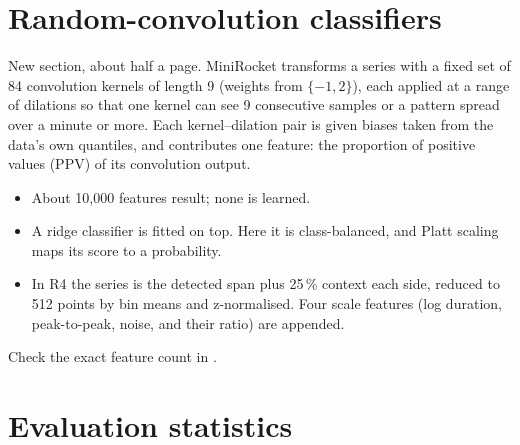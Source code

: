 \section{Random-convolution classifiers}
\label{sec:minirocket}

\begin{instructions}
New section, about half a page. MiniRocket \cite{dempster2021minirocket} transforms a series with a fixed set of 84
convolution kernels of length 9 (weights from $\{-1, 2\}$), each applied at a range of dilations so that one kernel can
see 9 consecutive samples or a pattern spread over a minute or more. Each kernel--dilation pair is given biases taken
from the data's own quantiles, and contributes one feature: the proportion of positive values (PPV) of its convolution
output.
\begin{itemize}
  \item About 10,000 features result; none is learned.
  \item A ridge classifier is fitted on top. Here it is class-balanced, and Platt scaling \cite{platt1999} maps its
        score to a probability.
  \item In R4 the series is the detected span plus 25\,\% context each side, reduced to 512 points by bin means and
        z-normalised. Four scale features (log duration, peak-to-peak, noise, and their ratio) are appended.
\end{itemize}
Check the exact feature count in .
\end{instructions}

\section{Evaluation statistics}
\label{sec:stats}

